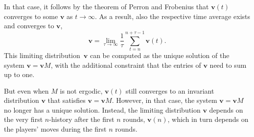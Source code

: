 \documentclass[9pt,twoside,lineno]{pnas-new}
\theoremstyle{plainCl1}
\theoremstyle{plainCl2}
\begin{document}
In that case, it follows by the theorem of Perron and Frobenius that $\mathbf{v}(t)$ converges to some $\mathbf{v}$ as $t\to \infty$. 
As a result, also the respective time average exists and converges to $\mathbf{v}$,
\begin{equation} \label{Eq:TimeAverage}
\mathbf{v} = \lim_{\tau\to\infty} \frac{1}{\tau} \sum_{t=n}^{n+\tau-1} \mathbf{v}(t).  
\end{equation}
This limiting distribution~$\mathbf{v}$ can be computed as the unique solution of the system $\mathbf{v} \!=\! \mathbf{v}M$, with the additional constraint that the entries of $\mathbf{v}$ need to sum up to one. 

But even when $M$ is not ergodic, $\mathbf{v}(t)$ still converges to an invariant distribution $\mathbf{v}$ that satisfies $\mathbf{v} \!=\! \mathbf{v}M$.
However, in that case, the system  $\mathbf{v} \!=\! \mathbf{v}M$ no longer has a unique solution. 
Instead, the limiting distribution $\mathbf{v}$ depends on the very first $n$-history after the first $n$ rounds, $\mathbf{v}(n)$, which in turn depends on the players' moves during the first $n$ rounds.\\ 

\end{document}

